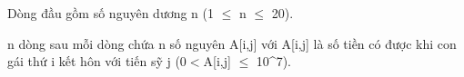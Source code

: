 Dòng đầu gồm số nguyên dương n (1  $\le$  n  $\le$  20).  

   n dòng sau mỗi dòng chứa n số nguyên A[i,j] với A[i,j] là số tiền có được khi con gái thứ i kết hôn với tiến sỹ j (0$<$A[i,j] $\le$ 10^7).